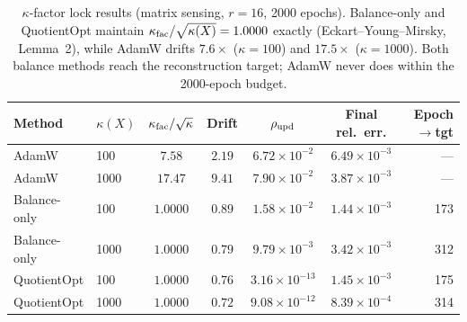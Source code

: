 \begin{table}[t]
\centering
\caption{$\kappa$-factor lock results (matrix sensing, $r=16$, 2000 epochs).
  Balance-only and QuotientOpt maintain $\kappa_{\rm fac}/\sqrt{\kappa(X)}=1.0000$ exactly
  (Eckart--Young--Mirsky, Lemma~2), while AdamW drifts $7.6\times$ ($\kappa=100$) and
  $17.5\times$ ($\kappa=1000$). Both balance methods reach the reconstruction target;
  AdamW never does within the 2000-epoch budget.}
\label{tab:kappa-lock}
\vspace{4pt}
\begin{tabular}{llccccr}
\toprule
\textbf{Method} & $\kappa(X)$ & $\kappa_{\rm fac}/\sqrt{\kappa}$ & Drift & $\rho_{\rm upd}$ & Final rel.\ err. & Epoch$\to$tgt \\
\midrule
AdamW & 100 & $7.58$ & $2.19$ & $6.72\times 10^{-2}$ & $6.49\times 10^{-3}$ & --- \\
AdamW & 1000 & $17.47$ & $9.41$ & $7.90\times 10^{-2}$ & $3.87\times 10^{-3}$ & --- \\
\midrule
Balance-only & 100 & $1.0000$ & $0.89$ & $1.58\times 10^{-2}$ & $1.44\times 10^{-3}$ & 173 \\
Balance-only & 1000 & $1.0000$ & $0.79$ & $9.79\times 10^{-3}$ & $3.42\times 10^{-3}$ & 312 \\
\midrule
\rowcolor{oursbg}QuotientOpt & 100 & $1.0000$ & $0.76$ & $3.16\times 10^{-13}$ & $1.45\times 10^{-3}$ & 175 \\
\rowcolor{oursbg}QuotientOpt & 1000 & $1.0000$ & $0.72$ & $9.08\times 10^{-12}$ & $8.39\times 10^{-4}$ & 314 \\
\bottomrule
\end{tabular}
\end{table}
